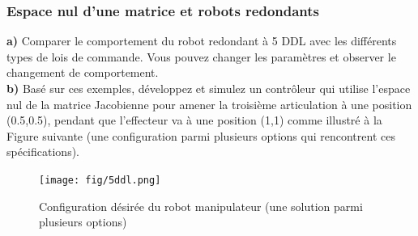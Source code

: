 \subsubsection{Espace nul d'une matrice et robots redondants}


\textbf{a)} Comparer le comportement du robot redondant à 5 DDL avec les différents types de lois de commande. Vous pouvez changer les paramètres et observer le changement de comportement. \\

\textbf{b)} Basé sur ces exemples, développez et simulez un contrôleur qui utilise l'espace nul de la matrice Jacobienne pour amener la troisième articulation à une position (0.5,0.5), pendant que l'effecteur va à une position (1,1) comme illustré à la Figure suivante (une configuration parmi plusieurs options qui rencontrent ces spécifications).

\begin{figure}[htbp]
	\centering
		\texttt{[image: fig/5ddl.png]}
	\caption{Configuration désirée du robot manipulateur (une solution parmi plusieurs options)}
	\label{fig:5ddfl}
\end{figure}
